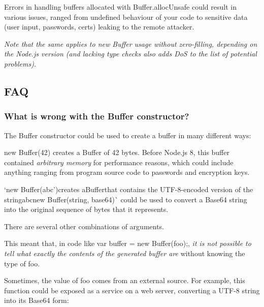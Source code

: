 Errors in handling buffers allocated with {\ttfamily Buffer.\+alloc\+Unsafe} could result in various issues, ranged from undefined behaviour of your code to sensitive data (user input, passwords, certs) leaking to the remote attacker.

{\itshape Note that the same applies to {\ttfamily new Buffer} usage without zero-\/filling, depending on the Node.\+js version (and lacking type checks also adds DoS to the list of potential problems).}

\subsection*{F\+AQ}

\subsubsection*{What is wrong with the {\ttfamily Buffer} constructor?}

The {\ttfamily Buffer} constructor could be used to create a buffer in many different ways\+:


\begin{DoxyItemize}
\item {\ttfamily new Buffer(42)} creates a {\ttfamily Buffer} of 42 bytes. Before Node.\+js 8, this buffer contained {\itshape arbitrary memory} for performance reasons, which could include anything ranging from program source code to passwords and encryption keys.
\item `new Buffer(\textquotesingle{}abc'){\ttfamily creates a}Buffer{\ttfamily that contains the U\+T\+F-\/8-\/encoded version of the string}\textquotesingle{}abcnew Buffer(string, \textquotesingle{}base64\textquotesingle{})\`{} could be used to convert a Base64 string into the original sequence of bytes that it represents.
\item There are several other combinations of arguments.
\end{DoxyItemize}

This meant that, in code like {\ttfamily var buffer = new Buffer(foo);}, {\itshape it is not possible to tell what exactly the contents of the generated buffer are} without knowing the type of {\ttfamily foo}.

Sometimes, the value of {\ttfamily foo} comes from an external source. For example, this function could be exposed as a service on a web server, converting a U\+T\+F-\/8 string into its Base64 form\+:


